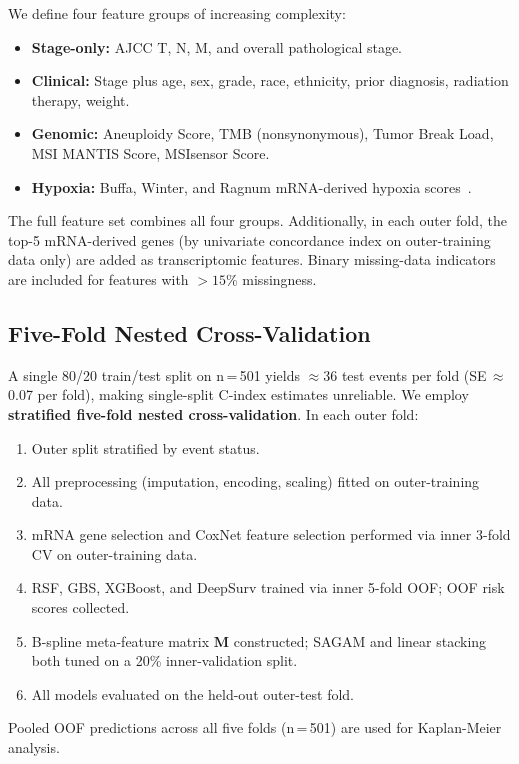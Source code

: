 \documentclass[conference]{IEEEtran}
\begin{document}
We define four feature groups of increasing complexity:
\begin{itemize}
  \item \textbf{Stage-only:} AJCC T, N, M, and overall pathological stage.
  \item \textbf{Clinical:} Stage plus age, sex, grade, race, ethnicity,
    prior diagnosis, radiation therapy, weight.
  \item \textbf{Genomic:} Aneuploidy Score, TMB (nonsynonymous), Tumor
    Break Load, MSI MANTIS Score, MSIsensor Score.
  \item \textbf{Hypoxia:} Buffa, Winter, and Ragnum mRNA-derived hypoxia
    scores~\cite{buffa2010hypoxia}.
\end{itemize}
The full feature set combines all four groups.
Additionally, in each outer fold, the top-5 mRNA-derived genes (by
univariate concordance index on outer-training data only) are added as
transcriptomic features.
Binary missing-data indicators are included for features with $>15\%$
missingness.

\subsection{Five-Fold Nested Cross-Validation}

A single 80/20 train/test split on n\,=\,501 yields $\approx$36 test
events per fold (SE\,$\approx$0.07 per fold), making single-split C-index
estimates unreliable.
We employ \textbf{stratified five-fold nested cross-validation}.
In each outer fold:
\begin{enumerate}
  \item Outer split stratified by event status.
  \item All preprocessing (imputation, encoding, scaling) fitted on
    outer-training data.
  \item mRNA gene selection and CoxNet feature selection performed via
    inner 3-fold CV on outer-training data.
  \item RSF, GBS, XGBoost, and DeepSurv trained via inner 5-fold OOF;
    OOF risk scores collected.
  \item B-spline meta-feature matrix $\mathbf{M}$ constructed; SAGAM and
    linear stacking both tuned on a 20\% inner-validation split.
  \item All models evaluated on the held-out outer-test fold.
\end{enumerate}
Pooled OOF predictions across all five folds (n\,=\,501) are used for
Kaplan-Meier analysis.
\end{document}
